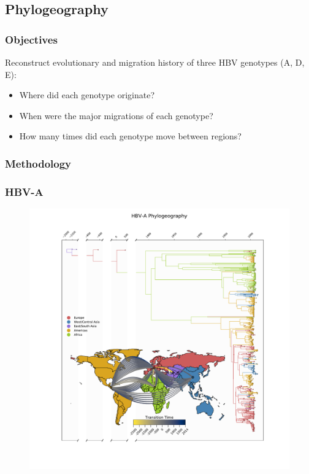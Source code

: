 \documentclass{beamer}
\begin{document}
\subsection{Phylogeography}

\begin{frame}
  \frametitle{Objectives}
  Reconstruct evolutionary and migration history of three HBV genotypes (A, D, E):
  \begin{itemize}
    \item Where did each genotype originate?
    \item When were the major migrations of each genotype?
    \item How many times did each genotype move between regions?
  \end{itemize}
\end{frame}


\begin{frame}
  \frametitle{Methodology}
\end{frame}


\begin{frame}
  \frametitle{HBV-A}
  \begin{figure}
    \includegraphics[width=.6\linewidth]{image/results/HBV-A_phylogeography_and_mcc_tree}
  \end{figure}
\end{frame}

\end{document}
